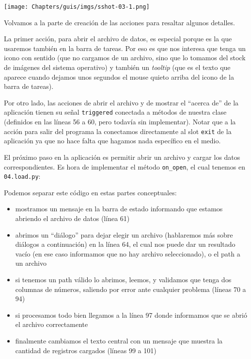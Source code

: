 \begin{center}
    \texttt{[image: Chapters/guis/imgs/sshot-03-1.png]}
\end{center}

Volvamos a la parte de creación de las acciones para resaltar algunos detalles.

La primer acción, para abrir el archivo de datos, es especial porque es la que usaremos también en la barra de tareas. Por eso es que nos interesa que tenga un icono con sentido (que no cargamos de un archivo, sino que lo tomamos del stock de imágenes del sistema operativo) y también un \textit{tooltip} (que es el texto que aparece cuando dejamos unos segundos el mouse quieto arriba del icono de la barra de tareas).

Por otro lado, las acciones de abrir el archivo y de mostrar el ``acerca de'' de la aplicación tienen su señal \texttt{triggered} conectada a métodos de nuestra clase (definidos en las líneas 56 a 60, pero todavía sin implementar). Notar que a la acción para salir del programa la conectamos directamente al slot \texttt{exit} de la aplicación ya que no hace falta que hagamos nada específico en el medio.

El próximo paso en la aplicación es permitir abrir un archivo y cargar los datos correspondientes. Es hora de implementar el método \texttt{on\_open}, el cual tenemos en \texttt{04.load.py}:


Podemos separar este código en estas partes conceptuales: 

\begin{itemize}
    \item mostramos un mensaje en la barra de estado informando que estamos abriendo el archivo de datos (línea 61)
    \item abrimos un ``diálogo''  para dejar elegir un archivo (hablaremos más sobre diálogos a continuación) en la línea 64, el cual nos puede dar un resultado vacío (en ese caso informamos que no hay archivo seleccionado), o el path a un archivo
    \item si tenemos un path válido lo abrimos, leemos, y validamos que tenga dos columnas de números, saliendo por error ante cualquier problema (líneas 70 a 94)
    \item si procesamos todo bien llegamos a la línea 97 donde informamos que se abrió el archivo correctamente
    \item finalmente cambiamos el texto central con un mensaje que muestra la cantidad de registros cargados (líneas 99 a 101)
\end{itemize}

